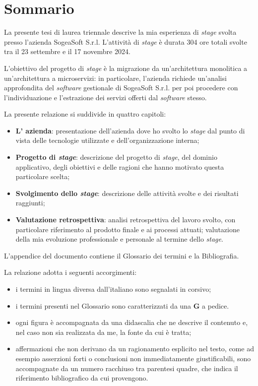 \chapter*{Sommario}
\vspace{0.5cm}
\noindent La presente tesi di laurea triennale descrive la mia esperienza di \textit{stage} svolta presso l'azienda SogeaSoft S.r.l. L'attività di \textit{stage} è durata 304 ore totali svolte tra il 23 settembre e il 17 novembre 2024. 


\noindent L'obiettivo del progetto di \textit{stage} è la migrazione da un'architettura monolitica a un'architettura a microservizi: in particolare, l'azienda richiede un'analisi approfondita del \textit{software} gestionale di SogeaSoft S.r.l. per poi procedere con l'individuazione e l'estrazione dei servizi offerti dal \textit{software} stesso. 

\noindent La presente relazione si suddivide in quattro capitoli:
\begin{itemize}
    \item \textbf{L' azienda}: presentazione dell'azienda dove ho svolto lo \textit{stage} dal punto di vista delle tecnologie utilizzate e dell'organizzazione interna;
    \item \textbf{Progetto di \textit{stage}}: descrizione del progetto di \textit{stage}, del dominio applicativo, degli obiettivi e delle ragioni che hanno motivato questa particolare scelta;
    \item \textbf{Svolgimento dello \textit{stage}}: descrizione delle attività svolte e dei risultati raggiunti;
    \item \textbf{Valutazione retrospettiva}: analisi retrospettiva del lavoro svolto, con particolare riferimento al prodotto finale e ai processi attuati; valutazione della mia evoluzione professionale e personale al termine dello \textit{stage}.
   \end{itemize}

\noindent L'appendice del documento contiene il Glossario dei termini e la Bibliografia. 

\noindent La relazione adotta i seguenti accorgimenti:
\begin{itemize}
    \item i termini in lingua diversa dall'italiano sono segnalati in corsivo;
    \item i termini presenti nel Glossario sono caratterizzati da una \textbf{G} a pedice. 
    \item ogni figura è accompagnata da una didascalia che ne descrive il contenuto e, nel caso non sia realizzata da me, la fonte da cui è tratta;
    \item affermazioni che non derivano da un ragionamento esplicito nel testo, come ad esempio asserzioni forti o conclusioni non immediatamente giustificabili, sono accompagnate da un numero racchiuso tra parentesi quadre, che indica il riferimento bibliografico da cui provengono. 
\end{itemize}

\clearpage
